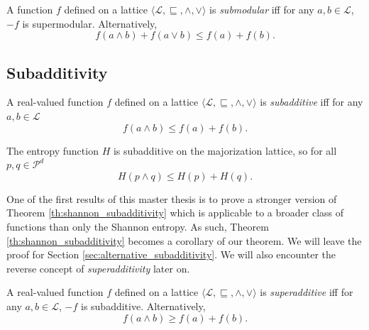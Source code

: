 \begin{definition} \label{def:submodularity}
    A function $f$ defined on a lattice $\langle \mathcal{L}, \sqsubseteq, \wedge, \vee \rangle$ is \textit{submodular} iff for any $a, b \in \mathcal{L}$, $-f$ is supermodular. Alternatively,
    \begin{equation}
        f(a \wedge b) + f(a \vee b) \leq f(a) + f(b).
    \end{equation}
\end{definition}



\subsection{Subadditivity} \label{sec:subadditivity}

\begin{definition}[Subadditivity] \label{def:subadditivity}
    A real-valued function $f$ defined on a lattice $\langle \mathcal{L}, \sqsubseteq, \wedge, \vee \rangle$ is \textit{subadditive} iff for any $a, b \in \mathcal{L}$
    \begin{equation}
        f(a \wedge b) \leq f(a) + f(b).
    \end{equation}
\end{definition}

\begin{theorem} \label{th:shannon_subadditivity}
    The entropy function $H$ is subadditive on the majorization lattice, so for all $p, q \in \mathcal{P}^d$
    \begin{equation}
        H(p \wedge q) \leq H(p) + H(q).
    \end{equation}
\end{theorem}

One of the first results of this master thesis is to prove a stronger version of Theorem \ref{th:shannon_subadditivity} which is applicable to a broader class of functions than only the Shannon entropy. As such, Theorem \ref{th:shannon_subadditivity} becomes a corollary of our theorem. We will leave the proof for Section \ref{sec:alternative_subadditivity}. We will also encounter the reverse concept of \textit{superadditivity} later on.

\begin{definition}[Superadditivity] \label{def:superadditivity}
    A real-valued function $f$ defined on a lattice $\langle \mathcal{L}, \sqsubseteq, \wedge, \vee \rangle$ is \textit{superadditive} iff for any $a, b \in \mathcal{L}$, $-f$ is subadditive. Alternatively,
    \begin{equation}
        f(a \wedge b) \geq f(a) + f(b).
    \end{equation}
\end{definition}




